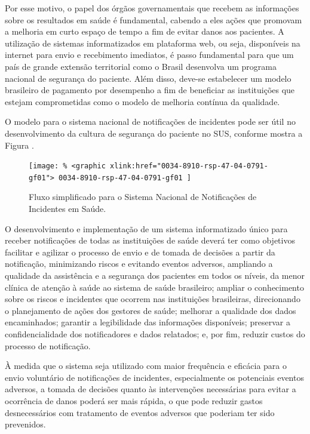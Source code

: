 \documentclass{article}
\begin{document}

Por esse motivo, o papel dos órgãos governamentais que recebem as informações sobre os
        resultados em saúde é fundamental, cabendo a eles ações que promovam a melhoria em curto
        espaço de tempo a fim de evitar danos aos pacientes. A utilização de sistemas informatizados
        em plataforma web, ou seja, disponíveis na internet para envio e recebimento imediatos, é
        passo fundamental para que um país de grande extensão territorial como o Brasil desenvolva
        um programa nacional de segurança do paciente. Além disso, deve-se estabelecer um modelo
        brasileiro de pagamento por desempenho a fim de beneficiar as instituições que estejam
        comprometidas como o modelo de melhoria contínua da qualidade.

O modelo para o sistema nacional de notificações de incidentes pode ser útil no
        desenvolvimento da cultura de segurança do paciente no SUS, conforme mostra a %
Figura%
 .

\begin{figure}
\texttt{[image: \% <graphic xlink:href="0034-8910-rsp-47-04-0791-gf01">
0034-8910-rsp-47-04-0791-gf01
]}
\caption{%
Fluxo simplificado para o Sistema Nacional de Notificações de Incidentes em
              Saúde.}
\end{figure}


O desenvolvimento e implementação de um sistema informatizado único para receber
        notificações de todas as instituições de saúde deverá ter como objetivos facilitar e
        agilizar o processo de envio e de tomada de decisões a partir da notificação, minimizando
        riscos e evitando eventos adversos, ampliando a qualidade da assistência e a segurança dos
        pacientes em todos os níveis, da menor clínica de atenção à saúde ao sistema de saúde
        brasileiro; ampliar o conhecimento sobre os riscos e incidentes que ocorrem nas instituições
        brasileiras, direcionando o planejamento de ações dos gestores de saúde; melhorar a
        qualidade dos dados encaminhados; garantir a legibilidade das informações disponíveis;
        preservar a confidencialidade dos notificadores e dados relatados; e, por fim, reduzir
        custos do processo de notificação.

À medida que o sistema seja utilizado com maior frequência e eficácia para o envio
        voluntário de notificações de incidentes, especialmente os potenciais eventos adversos, a
        tomada de decisões quanto às intervenções necessárias para evitar a ocorrência de danos
        poderá ser mais rápida, o que pode reduzir gastos desnecessários com tratamento de eventos
        adversos que poderiam ter sido prevenidos.
\end{document}
